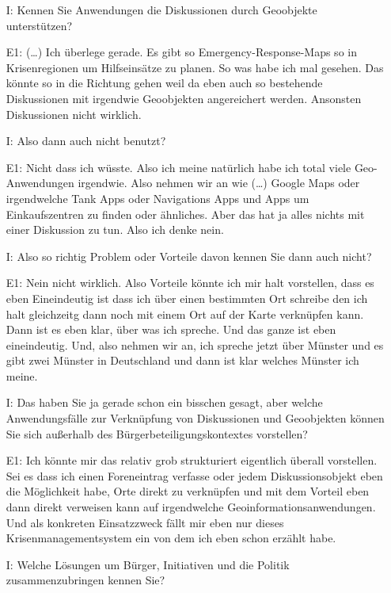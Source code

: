 \begin{itemize}
    \item[I:] Kennen Sie Anwendungen die Diskussionen durch Geoobjekte unterst{\"u}tzen?
    \item[E1:] (\dots) Ich {\"u}berlege gerade. Es gibt so Emergency-Response-Maps so in Krisenregionen um Hilfseins{\"a}tze zu planen. So was habe ich mal gesehen. Das k{\"o}nnte so in die Richtung gehen weil da eben auch so bestehende Diskussionen mit irgendwie Geoobjekten angereichert werden. Ansonsten Diskussionen nicht wirklich.
    \item[I:] Also dann auch nicht benutzt?
    \item[E1:] Nicht dass ich w{\"u}sste. Also ich meine nat{\"u}rlich habe ich total viele Geo-Anwendungen irgendwie. Also nehmen wir an wie (\dots) Google Maps oder irgendwelche Tank Apps oder Navigations Apps und Apps um Einkaufszentren zu finden oder {\"a}hnliches. Aber das hat ja alles nichts mit einer Diskussion zu tun. Also ich denke nein.
    \item[I:] Also so richtig Problem oder Vorteile davon kennen Sie dann auch nicht?
    \item[E1:] Nein nicht wirklich. Also Vorteile k{\"o}nnte ich mir halt vorstellen, dass es eben Eineindeutig ist dass ich {\"u}ber einen bestimmten Ort schreibe den ich halt gleichzeitg dann noch mit einem Ort auf der Karte verkn{\"u}pfen kann. Dann ist es eben klar, {\"u}ber was ich spreche. Und das ganze ist eben eineindeutig. Und, also nehmen wir an, ich spreche jetzt {\"u}ber M{\"u}nster und es gibt zwei M{\"u}nster in Deutschland und dann ist klar welches M{\"u}nster ich meine.
    \item[I:] Das haben Sie ja gerade schon ein bisschen gesagt, aber welche Anwendungsf{\"a}lle zur Verkn{\"u}pfung von Diskussionen und Geoobjekten k{\"o}nnen Sie sich au{\ss}erhalb des B{\"u}rgerbeteiligungskontextes vorstellen?
    \item[E1:] Ich k{\"o}nnte mir das relativ grob strukturiert eigentlich {\"u}berall vorstellen. Sei es dass ich einen Foreneintrag verfasse oder jedem Diskussionsobjekt eben die M{\"o}glichkeit habe, Orte direkt zu verkn{\"u}pfen und mit dem Vorteil eben dann direkt verweisen kann auf irgendwelche Geoinformationsanwendungen. Und als konkreten Einsatzzweck f{\"a}llt mir eben nur dieses Krisenmanagementsystem ein von dem ich eben schon erz{\"a}hlt habe.
    \item[I:] Welche L{\"o}sungen um B{\"u}rger, Initiativen und die Politik zusammenzubringen kennen Sie?

\end{itemize}
